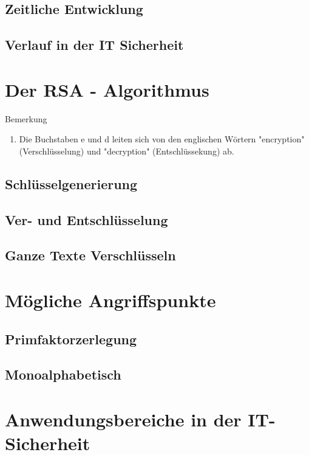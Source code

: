 \documentclass[12pt,a4paper]{scrartcl}
\begin{document}
	\subsection{Zeitliche Entwicklung}
	\subsection{Verlauf in der IT Sicherheit}

\section{Der RSA - Algorithmus}

	Bemerkung
	\begin{enumerate}
	\item Die Buchstaben e und d leiten sich von den englischen Wörtern "encryption" (Verschlüsselung) und "decryption" (Entschlüssekung) ab.
		\end{enumerate}
		
	\subsection{Schlüsselgenerierung}
	\subsection{Ver- und Entschlüsselung}
	\subsection{Ganze Texte Verschlüsseln}

\section{Mögliche Angriffspunkte}
	\subsection{Primfaktorzerlegung}
	\subsection{Monoalphabetisch}

\section{Anwendungsbereiche in der IT- Sicherheit}
\end{document}
